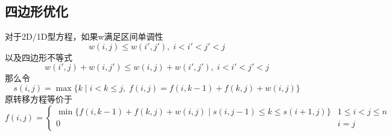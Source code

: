 \subsection{四边形优化}
对于2D/1D型方程，如果w满足区间单调性
\begin{displaymath}
	w(i,j)\leqslant w(i',j'),\;i<i'<j'<j
\end{displaymath}
以及四边形不等式
\begin{displaymath}
	w(i',j)+w(i,j')\leqslant w(i,j)+w(i',j'),\;i<i'<j'<j
\end{displaymath}
那么令
\begin{displaymath}
	s(i,j)=\max\{k\;|\;i<k\leqslant j,\;f(i,j)=f(i,k-1)+f(k,j)+w(i,j)\}	
\end{displaymath}
原转移方程等价于
\begin{displaymath}
	f(i,j)=
		\begin{cases}
			\min\{f(i,k-1)+f(k,j)+w(i,j)\;|\;s(i,j-1)\leqslant k\leqslant s(i+1,j)\} & 1\leqslant i<j\leqslant n \\
			0                                                                        & i=j
		\end{cases}
\end{displaymath}